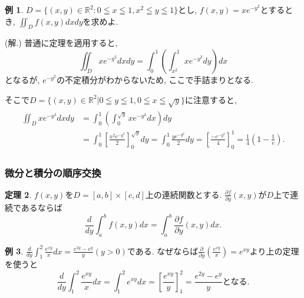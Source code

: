 \documentclass[dvipdfmx,a4paper,11pt]{article}
\newcommand{\R}{\mathbb{R}}
\theoremstyle{definition}
\newtheorem{thm}{定理}
\newtheorem{exa}[thm]{例}
\newcommand{\pdrv}[2]{\frac{\partial #1}{\partial #2}}
\newcommand{\drv}[2]{\frac{d #1}{d#2}}
\begin{document}
    \begin{exa}
$D = \{ (x,y) \in \R^2 : 0 \leqq x \leqq 1, x^2 \leqq y \leqq 1 \}$とし, 
$f(x,y)=xe^{-y^2}$とするとき,  $\iint_{D}f(x,y)dxdy$を求めよ.

\hspace{-11pt}(解.) 普通に定理を適用すると, 
$$
\iint_{D} xe^{-y^2}dxdy = \int_{0}^{1} \left( \int_{x^2}^{1} xe^{-y^2}dy    \right) dx
$$
となるが, $e^{-y^2}$の不定積分がわからないため, ここで手詰まりとなる.

そこで$D = \{ (x,y) \in \R^2 | 0 \leqq y \leqq 1, 0 \leqq x \leqq \sqrt{y} \}$に注意すると, 
\begin{align*}
\begin{split}
\iint_{D} xe^{-y^2}dxdy &= \int_{0}^{1} \left( \int_{0}^{\sqrt{y}} xe^{-y^2}dx   \right) dy \\
&= \int_{0}^{1}\left[ \frac{x^{2} e^{-y^2} }{2}  \right]_{0}^{\sqrt{y}} dy
=  \int_{0}^{1}    \frac{y e^{-y^2} }{2}      dy
= \left[  \frac{- e^{-y^2} }{4}   \right]_{0}^{1} = \frac{1}{4}\left( 1 - \frac{1}{e}\right).
\end{split}
\end{align*}
  \end{exa}

\subsubsection{微分と積分の順序交換}
 
 \begin{tcolorbox}[
    colback = white,
    colframe = green!35!black,
    fonttitle = \bfseries,
    breakable = true]
    \begin{thm}
$f(x,y)$を$D = [a,b]\times [c,d]$上の連続関数とする.
$\pdrv{f}{y}(x,y)$が$D$上で連続であるならば
$$
\drv{}{y} \int_{a}^{b} f(x,y) dx
=
\int_{a}^{b} \pdrv{f}{y}(x,y)dx.
$$
        \end{thm}
 \end{tcolorbox}
 \begin{exa}
$\drv{}{y} \int_{1}^{2} \frac{e^{xy}}{x} dx =\frac{e^{2y} - e^{y}}{y}(y>0)$である. なぜならば$ \pdrv{}{y}(\frac{e^{xy}}{x}) = e^{xy}$より上の定理を使うと
$$
\drv{}{y} \int_{1}^{2} \frac{e^{xy}}{x} dx
=
\int_{1}^{2} e^{xy} dx = \left[\frac{e^{xy}}{y}\right]_{1}^{2} = \frac{e^{2y} - e^{y}}{y} \text{となる.}
$$
 \end{exa}


  
\end{document}
